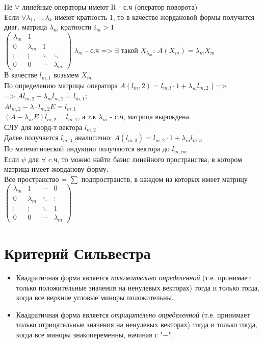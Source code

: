 \documentclass[12pt]{article}
\begin{document}
Не \(\forall\) линейные операторы имеют R - с.ч (оператор поворота)\\
Если  \(\forall \lambda_1,\cdots,\lambda_k\) имеют кратность 1, то в качестве жордановой формы получится диаг. матрица \(\lambda_m\) кратности \(i_m > 1\) \\
$
    \begin{pmatrix}
        \lambda_m & 1                              \\
        0         & \lambda_m & 1                  \\
        \vdots    & \vdots    & \ddots & \ddots    \\
        0         & 0         & \cdots & \lambda_m
    \end{pmatrix}$ $\lambda_m$ - с.ч => $\exists$ такой $X_{\lambda_m}$: $A(X_m) = \lambda_mX_m$\\
В качестве $l_{m,1}$ возьмем $X_m$\\
По определению матрицы оператора $A(l_m, 2) = l_{m, l} \cdot 1 + \lambda_ml_{m, 2}$ | =>\\
=> $Al_{m, 2} - \lambda_ml_{m, 2} = l_{m, 1}$;\\
$Al_{m, 2} - \lambda \cdot l_{m, 2}E = l_{m, 1}$\\
$(A - \lambda_mE)l_{m, 2} = l_{m, 1}$, а т.к $\lambda_m$ - с.ч, матрица вырождена. \\
СЛУ для коорд-т вектора $l_{m, 2}$ \\
Далее получается $l_{m, 3}$ аналогично: $A(l_{m, 3}) = l_{m, 2} \cdot 1 + \lambda_ml_{m, 3}$\\
По математической индукции получаются вектора до $l_{m, im}$\\
Если $\psi$ для $\forall$ c.ч, то можно найти базис линейного пространства, в котором матрица имеет жорданову форму.\\
Все пространство = $\sum$ подпространств, в каждом из которых имеет матрицу
$
    \begin{pmatrix}
        \lambda_m & 1         & \cdots & 0         \\
        0         & \lambda_m & \ddots & \vdots    \\
        \vdots    & \vdots    & \ddots & 1         \\
        0         & 0         & \cdots & \lambda_m
    \end{pmatrix}
$

\section{Критерий Сильвестра}
\begin{itemize}
    \item Квадратичная форма является
          \textit{положительно определенной} (т.е.
          принимает только положительные значения
          на ненулевых векторах) тогда и только тогда,
          когда все верхние угловые миноры положительны.
    \item Квадратичная форма является
          \textit{отрицательно определенной} (т.е.
          принимает только отрицательные значения
          на ненулевых векторах) тогда и только тогда,
          когда все миноры знакопеременны, начиная с "$-$".
\end{itemize}
\end{document}
